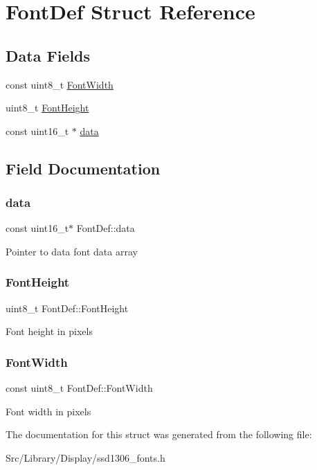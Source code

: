 \hypertarget{struct_font_def}{}\section{Font\+Def Struct Reference}
\label{struct_font_def}
\subsection*{Data Fields}
\begin{DoxyCompactItemize}
\item 
const uint8\+\_\+t \hyperlink{struct_font_def_a9e22d0bdbc21eadba6155f31d742f85f}{Font\+Width}
\item 
uint8\+\_\+t \hyperlink{struct_font_def_a4e3e31a3a441bc010a432564e5da887d}{Font\+Height}
\item 
const uint16\+\_\+t $\ast$ \hyperlink{struct_font_def_a864722845b4def15a6c53bdc4e94a24a}{data}
\end{DoxyCompactItemize}


\subsection{Field Documentation}
\mbox{\label{struct_font_def_a864722845b4def15a6c53bdc4e94a24a}} 
\subsubsection{\texorpdfstring{data}{data}}
{\footnotesize\ttfamily const uint16\+\_\+t$\ast$ Font\+Def\+::data}

Pointer to data font data array \mbox{\label{struct_font_def_a4e3e31a3a441bc010a432564e5da887d}} 
\subsubsection{\texorpdfstring{Font\+Height}{FontHeight}}
{\footnotesize\ttfamily uint8\+\_\+t Font\+Def\+::\+Font\+Height}

Font height in pixels \mbox{\label{struct_font_def_a9e22d0bdbc21eadba6155f31d742f85f}} 
\subsubsection{\texorpdfstring{Font\+Width}{FontWidth}}
{\footnotesize\ttfamily const uint8\+\_\+t Font\+Def\+::\+Font\+Width}

Font width in pixels 

The documentation for this struct was generated from the following file\+:\begin{DoxyCompactItemize}
\item 
Src/\+Library/\+Display/ssd1306\+\_\+fonts.\+h\end{DoxyCompactItemize}
